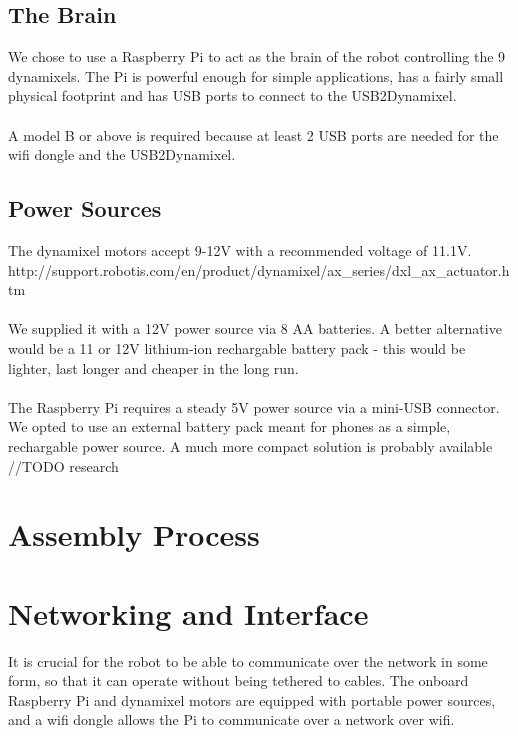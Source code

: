 \documentclass[]{article}
\begin{document}
\subsection{The Brain}
We chose to use a Raspberry Pi to act as the brain of the robot controlling the 9 dynamixels. The Pi is powerful enough for simple applications, has a fairly small physical footprint and has USB ports to connect to the USB2Dynamixel.
\\
\\
A model B or above is required because at least 2 USB ports are needed for the wifi dongle and the USB2Dynamixel.

\subsection{Power Sources}
The dynamixel motors accept 9-12V with a recommended voltage of 11.1V. http://support.robotis.com/en/product/dynamixel/ax\_series/dxl\_ax\_actuator.htm
\\
\\
We supplied it with a 12V power source via 8 AA batteries. A better alternative would be a 11 or 12V lithium-ion rechargable battery pack - this would be lighter, last longer and cheaper in the long run.
\\
\\
The Raspberry Pi requires a steady 5V power source via a mini-USB connector. We opted to use an external battery pack meant for phones as a simple, rechargable power source. A much more compact solution is probably available //TODO research

\section{Assembly Process}

\section{Networking and Interface}
It is crucial for the robot to be able to communicate over the network in some form, so that it can operate without being tethered to cables. The onboard Raspberry Pi and dynamixel motors are equipped with portable power sources, and a wifi dongle allows the Pi to communicate over a network over wifi.
\end{document}
